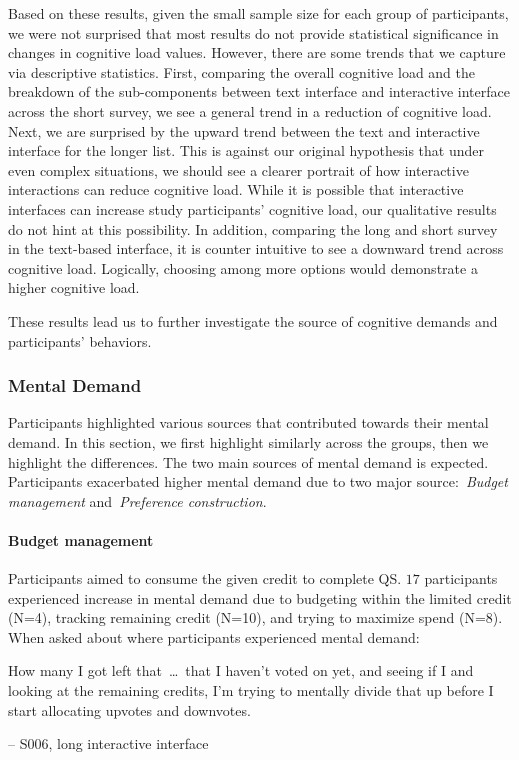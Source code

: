 Based on these results, given the small sample size for each group of participants, we were not surprised that most results do not provide statistical significance in changes in cognitive load values. However, there are some trends that we capture via descriptive statistics. First, comparing the overall cognitive load and the breakdown of the sub-components between text interface and interactive interface across the short survey, we see a general trend in a reduction of cognitive load. Next, we are surprised by the upward trend between the text and interactive interface for the longer list. This is against our original hypothesis that under even complex situations, we should see a clearer portrait of how interactive interactions can reduce cognitive load. While it is possible that interactive interfaces can increase study participants' cognitive load, our qualitative results do not hint at this possibility. In addition, comparing the long and short survey in the text-based interface, it is counter intuitive to see a downward trend across cognitive load. Logically, choosing among more options would demonstrate a higher cognitive load.

These results lead us to further investigate the source of cognitive demands and participants' behaviors.

\subsubsection{Mental Demand}
Participants highlighted various sources that contributed towards their mental demand. In this section, we first highlight similarly across the groups, then we highlight the differences. The two main sources of mental demand is expected. Participants exacerbated higher mental demand due to two major source:~\textit{Budget management} and~\textit{Preference construction}.

\paragraph{Budget management} Participants aimed to consume the given credit to complete QS. $17$ participants experienced increase in mental demand due to budgeting within the limited credit (N=4), tracking remaining credit (N=10), and trying to maximize spend (N=8). When asked about where participants experienced mental demand:

\begin{displayquote}
How many I got left that~\ldots\ that I haven't voted on yet, and seeing if I and looking at the remaining credits, I'm trying to mentally divide that up before I start allocating upvotes and downvotes.

\small{\noindent \hfill -- S006, long interactive interface}
\end{displayquote}


